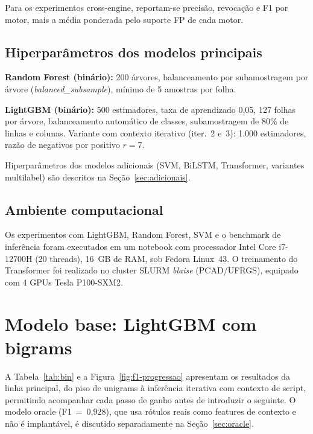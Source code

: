 Para os experimentos cross-engine, reportam-se precisão, revocação e F1 por motor,
mais a média ponderada pelo suporte FP de cada motor.

\subsection{Hiperparâmetros dos modelos principais}
\label{sub:exp-hp}

\textbf{Random Forest (binário):} 200 árvores, balanceamento por subamostragem
por árvore (\textit{balanced\_subsample}), mínimo de 5 amostras por folha.

\textbf{LightGBM (binário):} 500 estimadores, taxa de aprendizado 0,05, 127
folhas por árvore, balanceamento automático de classes, subamostragem de 80\%
de linhas e colunas. Variante com contexto iterativo (iter.~2 e~3): 1.000
estimadores, razão de negativos por positivo $r = 7$.

Hiperparâmetros dos modelos adicionais (SVM, BiLSTM, Transformer, variantes
multilabel) são descritos na Seção~\ref{sec:adicionais}.

\subsection{Ambiente computacional}
\label{sub:exp-ambiente}

Os experimentos com LightGBM, Random Forest, SVM e o benchmark de inferência
foram executados em um notebook com processador Intel Core i7-12700H (20
threads), 16~GB de RAM, sob Fedora Linux~43. O treinamento do Transformer foi
realizado no cluster SLURM \textit{blaise} (PCAD/UFRGS), equipado com 4
GPUs Tesla P100-SXM2.

\section{Modelo base: LightGBM com bigrams}
\label{sec:baseline}

A Tabela~\ref{tab:bin} e a Figura~\ref{fig:f1-progressao} apresentam os resultados
da linha principal, do piso de unigrams à inferência iterativa com contexto de
script, permitindo acompanhar cada passo de ganho antes de introduzir o seguinte. O modelo oracle
(F1~=~0,928), que usa rótulos reais como features de contexto e não é implantável,
é discutido separadamente na Seção~\ref{sec:oracle}.

